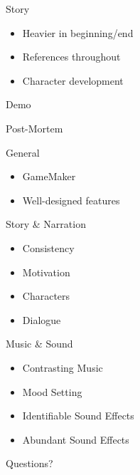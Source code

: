 \documentclass{../teamepsilon}
\begin{document}
\begin{frame}{Story}
    \begin{itemize}
        \item Heavier in beginning/end
        \item References throughout
        \item Character development
    \end{itemize}
\end{frame}


\begin{frame}[standout]
    \Huge
    Demo
\end{frame}

\begin{frame}[standout]
    \Huge
    Post-Mortem
\end{frame}


\begin{frame}{General}
    \begin{itemize}
        \item GameMaker
        \item Well-designed features
    \end{itemize}
\end{frame}

\begin{frame}{Story \& Narration}
    \begin{itemize}
        \item Consistency
        \item Motivation
        \item Characters
        \item Dialogue
    \end{itemize}
\end{frame}

\begin{frame}{Music \& Sound}
    \begin{itemize}
        \item Contrasting Music
        \item Mood Setting
        \item Identifiable Sound Effects
        \item Abundant Sound Effects
    \end{itemize}
\end{frame}

\begin{frame}[standout]
    \Huge
    Questions?
\end{frame}
\end{document}
